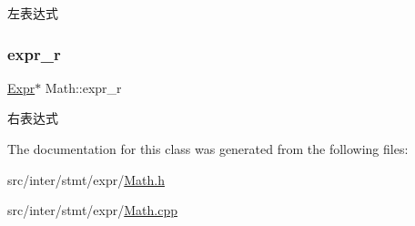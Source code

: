 左表达式 

\mbox{\label{class_math_a2e2eb1f4f47fd10466db783b20183307}} 
\subsubsection{\texorpdfstring{expr\+\_\+r}{expr\_r}}
{\footnotesize\ttfamily \hyperlink{class_expr}{Expr}$\ast$ Math\+::expr\+\_\+r}

右表达式 

The documentation for this class was generated from the following files\+:\begin{DoxyCompactItemize}
\item 
src/inter/stmt/expr/\hyperlink{_math_8h}{Math.\+h}\item 
src/inter/stmt/expr/\hyperlink{_math_8cpp}{Math.\+cpp}\end{DoxyCompactItemize}
